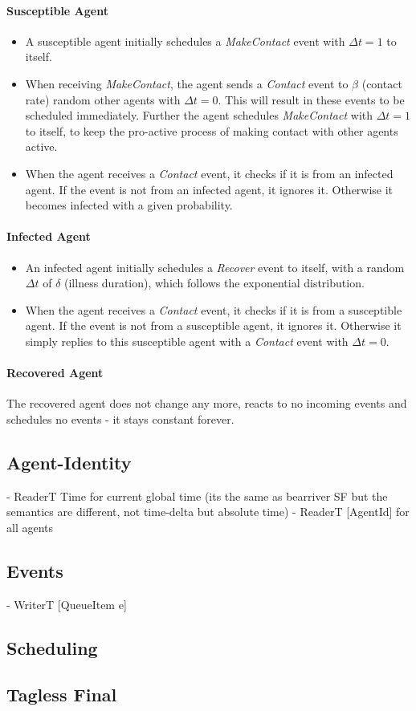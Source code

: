 \paragraph{Susceptible Agent}
\begin{itemize}
	\item A susceptible agent initially schedules a \textit{MakeContact} event with $\Delta t = 1$ to itself.
	\item When receiving \textit{MakeContact}, the agent sends a \textit{Contact} event to $\beta$ (contact rate) random other agents with $\Delta t = 0$. This will result in these events to be scheduled immediately. Further the agent schedules \textit{MakeContact} with $\Delta t = 1$ to itself, to keep the pro-active process of making contact with other agents active.
	\item When the agent receives a \textit{Contact} event, it checks if it is from an infected agent. If the event is not from an infected agent, it ignores it. Otherwise it becomes infected with a given probability.
\end{itemize}

\paragraph{Infected Agent}
\begin{itemize}
	\item An infected agent initially schedules a \textit{Recover} event to itself, with a random $\Delta t$ of $\delta$ (illness duration), which follows the exponential distribution.
	\item When the agent receives a \textit{Contact} event, it checks if it is from a susceptible agent. If the event is not from a susceptible agent, it ignores it. Otherwise it simply replies to this susceptible agent with a \textit{Contact} event with $\Delta t = 0$.
\end{itemize}

\paragraph{Recovered Agent}
The recovered agent does not change any more, reacts to no incoming events and schedules no events - it stays constant forever.

\subsection{Agent-Identity}
- ReaderT Time for current global time (its the same as bearriver SF but the semantics are different, not time-delta but absolute time)
- ReaderT [AgentId] for all agents

\subsection{Events}
- WriterT [QueueItem e]

\subsection{Scheduling}

\subsection{Tagless Final}
